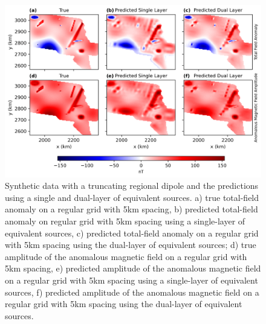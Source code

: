\begin{figure}[tb!]
\centering
\includegraphics[width=1\linewidth]{figures/truncated_regional.png}
\caption{
    Synthetic data with a truncating regional dipole and the predictions using a single and dual-layer of equivalent sources. a) true total-field anomaly on a regular grid with 5km spacing, b) predicted total-field anomaly on regular grid with 5km spacing using a single-layer of equivalent sources, c) predicted total-field anomaly on a regular grid with 5km spacing using the dual-layer of equivalent sources; d) true amplitude of the anomalous magnetic field on a regular grid with 5km spacing, e) predicted amplitude of the anomalous magnetic field on a regular grid with 5km spacing using a single-layer of equivalent sources, f) predicted amplitude of the anomalous magnetic field on a regular grid with 5km spacing using the dual-layer of equivalent sources.
}
\label{fig:truncated_regional}
\end{figure}

